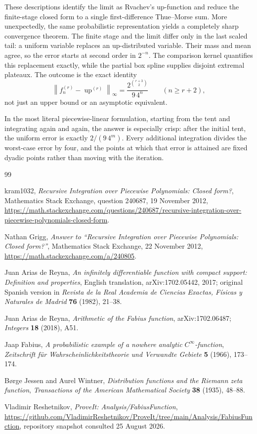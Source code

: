\documentclass[11pt,oneside]{article}
\theoremstyle{definition}
\theoremstyle{remark}
\newcommand{\Up}{\operatorname{up}}
\newcommand{\norm}[1]{\left\lVert#1\right\rVert}
\begin{document}
These descriptions identify the limit as Rvachev's up-function and reduce the finite-stage
closed form to a single first-difference Thue--Morse sum.  More unexpectedly, the same
probabilistic representation yields a completely sharp convergence theorem.  The finite
stage and the limit differ only in the last scaled tail: a uniform variable replaces an
up-distributed variable.  Their mass and mean agree, so the error starts at second order in
$2^{-n}$.  The comparison kernel quantifies this replacement exactly, while the partial
box spline supplies disjoint extremal plateaux.  The outcome is the exact identity
\[
 \norm{f_n^{(r)}-\Up^{(r)}}_\infty
 =\frac{2^{\binom{r+3}{2}}}{9\,4^n}
 \qquad(n\ge r+2),
\]
not just an upper bound or an asymptotic equivalent.

In the most literal piecewise-linear formulation, starting from the tent and integrating
again and again, the answer is especially crisp: after the initial tent, the uniform error
is exactly $2/(9\,4^m)$.  Every additional integration divides the worst-case error by four,
and the points at which that error is attained are fixed dyadic points rather than moving
with the iteration.

\begin{thebibliography}{99}

kram1032,
\emph{Recursive Integration over Piecewise Polynomials: Closed form?},
Mathematics Stack Exchange, question 240687, 19 November 2012,
\url{https://math.stackexchange.com/questions/240687/recursive-integration-over-piecewise-polynomials-closed-form}.

Nathan Grigg,
\emph{Answer to ``Recursive Integration over Piecewise Polynomials: Closed form?''},
Mathematics Stack Exchange, 22 November 2012,
\url{https://math.stackexchange.com/a/240805}.

Juan Arias de Reyna,
\emph{An infinitely differentiable function with compact support: Definition and
properties},
English translation, arXiv:1702.05442, 2017; original Spanish version in
\emph{Revista de la Real Academia de Ciencias Exactas, Físicas y Naturales de Madrid}
\textbf{76} (1982), 21--38.

Juan Arias de Reyna,
\emph{Arithmetic of the Fabius function},
arXiv:1702.06487; \emph{Integers} \textbf{18} (2018), A51.

Jaap Fabius,
\emph{A probabilistic example of a nowhere analytic $C^\infty$-function},
\emph{Zeitschrift für Wahrscheinlichkeitstheorie und Verwandte Gebiete}
\textbf{5} (1966), 173--174.

Børge Jessen and Aurel Wintner,
\emph{Distribution functions and the Riemann zeta function},
\emph{Transactions of the American Mathematical Society}
\textbf{38} (1935), 48--88.

Vladimir Reshetnikov,
\emph{ProveIt: Analysis/FabiusFunction},
\url{https://github.com/VladimirReshetnikov/ProveIt/tree/main/Analysis/FabiusFunction},
repository snapshot consulted 25 August 2026.

\end{thebibliography}
\end{document}
